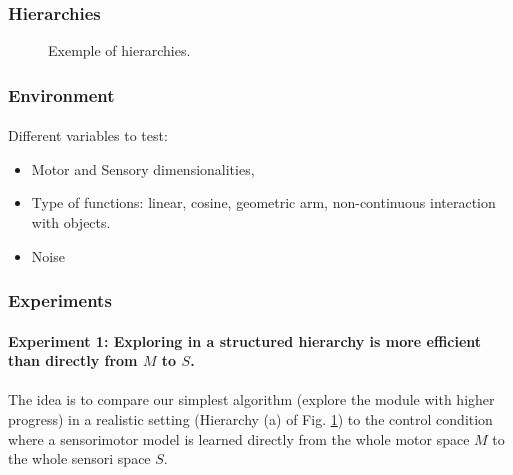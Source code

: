 \documentclass[12pt]{article}
\begin{document}
		
		\subsubsection{Hierarchies}
		
		

			\begin{figure}[H] 
				\subfloat[]{}
				\subfloat[]{}
				\subfloat[]{}
				\subfloat[]{}
				\caption{Exemple of hierarchies.}
				\label{H}					
			\end{figure}
		
		
		\subsubsection{Environment}
		
			\paragraph{}
			Different variables to test:
			\begin{itemize}
				\item Motor and Sensory dimensionalities,
				\item Type of functions: linear, cosine, geometric arm, non-continuous interaction with objects.
				\item Noise
			\end{itemize}
		
		

		\subsubsection{Experiments}

				\paragraph{Experiment 1: Exploring in a structured hierarchy is more efficient than directly from $M$ to $S$.}
				\paragraph{}
				The idea is to compare our simplest algorithm (explore the module with higher progress) in a realistic setting (Hierarchy (a) of Fig. \ref{H}) to the control condition where a sensorimotor model is learned
				directly from the whole motor space $M$ to the whole sensori space $S$.
								
\end{document}
